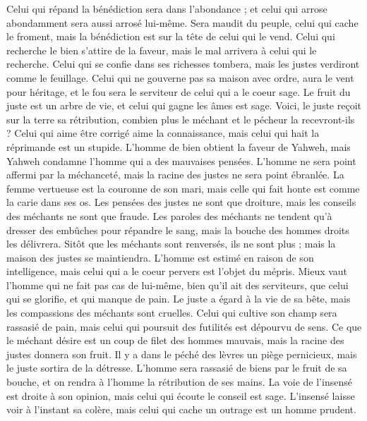\begin{multicols}{2}
Celui qui répand la bénédiction sera dans l’abondance ; et celui qui arrose abondamment sera aussi arrosé lui-même.
Sera maudit du peuple, celui qui cache le froment, mais la bénédiction est sur la tête de celui qui le vend.
Celui qui recherche le bien s’attire de la faveur, mais le mal arrivera à celui qui le recherche.
Celui qui se confie dans ses richesses tombera, mais les justes verdiront comme le feuillage.
Celui qui ne gouverne pas sa maison avec ordre, aura le vent pour héritage, et le fou sera le serviteur de celui qui a le coeur sage.
Le fruit du juste est un arbre de vie, et celui qui gagne les âmes est sage.
Voici, le juste reçoit sur la terre sa rétribution, combien plus le méchant et le pécheur la recevront-ils ?
\VerseOne{}Celui qui aime être corrigé aime la connaissance, mais celui qui hait la réprimande est un stupide.
L'homme de bien obtient la faveur de Yahweh, mais Yahweh condamne l'homme qui a des mauvaises pensées.
L'homme ne sera point affermi par la méchanceté, mais la racine des justes ne sera point ébranlée.
La femme vertueuse est la couronne de son mari, mais celle qui fait honte est comme la carie dans ses os.
Les pensées des justes ne sont que droiture, mais les conseils des méchants ne sont que fraude.
Les paroles des méchants ne tendent qu'à dresser des embûches pour répandre le sang, mais la bouche des hommes droits les délivrera.
Sitôt que les méchants sont renversés, ils ne sont plus ; mais la maison des justes se maintiendra.
L'homme est estimé en raison de son intelligence, mais celui qui a le coeur pervers est l’objet du mépris.
Mieux vaut l'homme qui ne fait pas cas de lui-même, bien qu'il ait des serviteurs, que celui qui se glorifie, et qui manque de pain.
Le juste a égard à la vie de sa bête, mais les compassions des méchants sont cruelles.
Celui qui cultive son champ sera rassasié de pain, mais celui qui poursuit des futilités est dépourvu de sens.
Ce que le méchant désire est un coup de filet des hommes mauvais, mais la racine des justes donnera son fruit.
Il y a dans le péché des lèvres un piège pernicieux, mais le juste sortira de la détresse.
L'homme sera rassasié de biens par le fruit de sa bouche, et on rendra à l'homme la rétribution de ses mains.
La voie de l’insensé est droite à son opinion, mais celui qui écoute le conseil est sage.
L’insensé laisse voir à l’instant sa colère, mais celui qui cache un outrage est un homme prudent.

\end{multicols}
